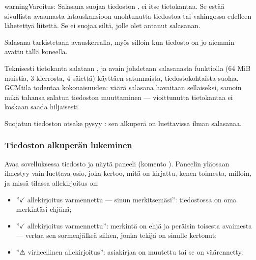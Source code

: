 \documentclass[letterpaper,10pt,finnish]{sphinxmanual}
\begin{document}
\begin{sphinxadmonition}{warning}{Varoitus:}
\sphinxAtStartPar
Salasana suojaa tiedoston , ei itse tietokantaa. Se estää sivullista avaamasta latauskansioon unohtunutta tiedostoa tai vahingossa edelleen lähetettyä liitettä. Se ei suojaa siltä, jolle olet antanut salasanan.
\end{sphinxadmonition}

\sphinxAtStartPar
Salasana tarkistetaan  avauskerralla, myös silloin kun tiedosto on jo aiemmin avattu tällä koneella.

\sphinxAtStartPar
Teknisesti tietokanta salataan , ja avain johdetaan salasanasta \sphinxhyphen{}funktiolla (64 MiB muistia, 3 kierrosta, 4 säiettä) käyttäen satunnaista, tiedostokohtaista suolaa. GCM\sphinxhyphen{}tila todentaa kokonaisuuden: väärä salasana havaitaan sellaiseksi, samoin mikä tahansa salatun tiedoston muuttaminen — vioittunutta tietokantaa ei koskaan saada hiljaisesti.

\sphinxAtStartPar
Suojatun tiedoston otsake pysyy : sen alkuperä on luettavissa ilman salasanaa.


\subsubsection{Tiedoston alkuperän lukeminen}
\label{\detokenize{manuel:lire-l-origine-d-un-fichier}}
\sphinxAtStartPar
Avaa sovelluksessa tiedosto ja näytä \sphinxhyphen{}paneeli (komento ). Paneelin yläosaan ilmestyy vain luettava \sphinxhyphen{}osio, joka kertoo, mitä on kirjattu, kenen toimesta, milloin, ja missä tilassa allekirjoitus on:
\begin{itemize}
\item {} 
\sphinxAtStartPar
”\(\checkmark\) allekirjoitus varmennettu — sinun merkitsemäsi”: tiedostossa on oma merkintäsi ehjänä;

\item {} 
\sphinxAtStartPar
”\(\checkmark\) allekirjoitus varmennettu”: merkintä on ehjä ja peräisin toisesta avaimesta — vertaa sen sormenjälkeä siihen, jonka tekijä on sinulle kertonut;

\item {} 
\sphinxAtStartPar
”⚠ virheellinen allekirjoitus”: asiakirjaa on muutettu tai se on väärennetty.

\end{itemize}
\end{document}
